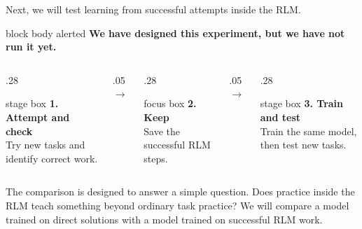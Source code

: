 \documentclass[aspectratio=169,11pt]{beamer}
\newcommand{\rlmstagebox}[1]{%
  \begin{beamercolorbox}[wd=\linewidth,sep=.55em,center,rounded=true]{stage box}
    #1
  \end{beamercolorbox}%
}
\newcommand{\rlmfocusbox}[1]{%
  \begin{beamercolorbox}[wd=\linewidth,sep=.55em,center,rounded=true]{focus box}
    #1
  \end{beamercolorbox}%
}
\begin{document}
\begin{frame}{Next, we will test learning from successful attempts inside the RLM.}
  \begin{beamercolorbox}[wd=\linewidth,sep=.55em,center,rounded=true]{block body alerted}
    \textbf{We have designed this experiment, but we have not run it yet.}
  \end{beamercolorbox}

  \vspace{0.3cm}
  \begin{columns}[c,onlytextwidth]
    \begin{column}{.28\textwidth}
      \rlmstagebox{\textbf{1. Attempt and check}\\[.15em]
        \small Try new tasks and identify correct work.}
    \end{column}
    \begin{column}{.05\textwidth}
      \centering\Large\color{RlmTeal}$\rightarrow$
    \end{column}
    \begin{column}{.28\textwidth}
      \rlmfocusbox{\textbf{2. Keep}\\[.15em]
        \small Save the successful RLM steps.}
    \end{column}
    \begin{column}{.05\textwidth}
      \centering\Large\color{RlmTeal}$\rightarrow$
    \end{column}
    \begin{column}{.28\textwidth}
      \rlmstagebox{\textbf{3. Train and test}\\[.15em]
        \small Train the same model, then test new tasks.}
    \end{column}
  \end{columns}

  \vspace{0.35cm}
  \begin{block}{The comparison is designed to answer a simple question.}
    Does practice inside the RLM teach something beyond ordinary task practice? We will compare a
    model trained on direct solutions with a model trained on successful RLM work.
  \end{block}

\end{frame}
\end{document}
